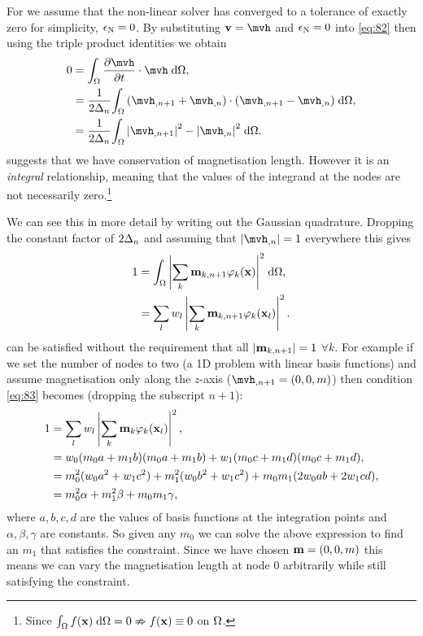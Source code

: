 {For  we assume that the non-linear solver has converged to a tolerance of exactly zero for simplicity, \ie $\epsilon_{\mathrm{N}} = 0$.
By substituting $\testv = \mvh$ and $\epsilon_{\mathrm{N}} = 0$ into \cref{eq:82} then using the triple product identities we obtain
\begin{equation}
  \label{eq:23}
  \begin{aligned}
    0 &= \ipg{\dmdth}{\mvh}, \\
    &= \frac{1}{2\dtn} \intd{(\mvh_{,n+1} + \mvh_{,n}) \cdot (\mvh_{,n+1} - \mvh_{,n})}, \\
    &= \frac{1}{2\dtn} \intd{\abs{\mvh_{,n+1}}^2 - \abs{\mvh_{,n}}^2}.
  \end{aligned}
\end{equation}
 suggests that we have conservation of magnetisation length.
However it is an \emph{integral} relationship, meaning that the values of the integrand at the nodes are not necessarily zero.\footnote{Since ${\int_{\Omega} { f(\boldsymbol{\mathrm{x}})} {\; \mathrm{{d}}} {\Omega}} = 0 \nRightarrow f(\boldsymbol{\mathrm{x}}) \equiv 0$ on $\Omega$.}

We can see this in more detail by writing out the Gaussian quadrature.
Dropping the constant factor of $2\Delta_{n}$ and assuming that $\abs{\mvh_{,n}} = 1$ everywhere this gives
\begin{equation}
  \begin{aligned}
    1 &= {\int_{\Omega} {\left|{\sum_k \boldsymbol{\mathrm{m}}_{k, n+1} \varphi_k(\boldsymbol{\mathrm{x}})} \right|^2} {\; \mathrm{{d}}} {\Omega}}, \\
    &= \sum_l w_l \left|{\sum_k \boldsymbol{\mathrm{m}}_{k, n+1} \varphi_k(\boldsymbol{\mathrm{x}}_l)} \right|^2.
    \label{eq:83}
  \end{aligned}
\end{equation}
 can be satisfied without the requirement that all $\left|{\boldsymbol{\mathrm{m}}_{k, n+1}} \right| = 1$ $\forall k$.
For example if we set the number of nodes to two (\ie a 1D problem with linear basis functions) and assume magnetisation only along the $z$-axis (\ie  $\mvh_{,n+1} = (0, 0, m)$) then condition \cref{eq:83} becomes (dropping the subscript $n+1$):
\begin{equation}
  \begin{aligned}
    1 &= \sum_l w_l \left|{\sum_k \boldsymbol{\mathrm{m}}_{k} \varphi_k(\boldsymbol{\mathrm{x}}_l)} \right|^2, \\
    &= w_0 (m_{0} a + m_{1} b)(m_{0} a + m_{1} b) + w_1 (m_{0} c + m_{1} d)(m_{0} c + m_{1} d), \\
    &= m_{0}^2 (w_0 a^2 + w_1 c^2) + m_{1}^2 (w_0 b^2 + w_1 c^2) + m_{0} m_{1} (2w_0ab + 2w_1cd), \\
    &= m_{0}^2 \alpha + m_{1}^2 \beta + m_{0} m_{1} \gamma, \\
  \end{aligned}
\end{equation}
where $a,b,c,d$ are the values of basis functions at the integration points and $\alpha, \beta, \gamma$ are constants.
So given any $m_{0}$ we can solve the above expression to find an $m_{1}$ that satisfies the constraint.
Since we have chosen $\boldsymbol{\mathrm{m}} = (0, 0, m)$ this means we can vary the magnetisation length at node 0 arbitrarily while still satisfying the constraint.

}
